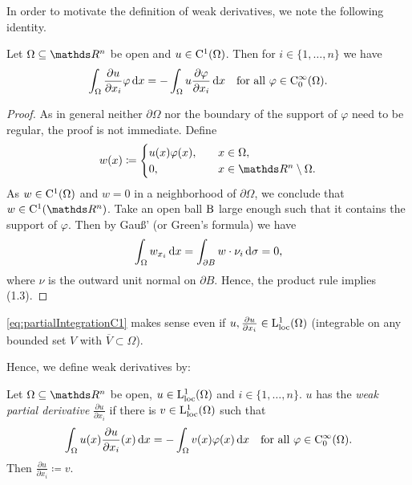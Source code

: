 In order to motivate the definition of weak derivatives, we note the following identity.

\begin{lem}
  \label{lem:partialIntegrationC1}
  Let $\Omega \subseteq \R^n$ be open and $u \in \mathrm{C}^1(\Omega)$. 
  Then for $i \in \{1,\dots,n\}$ we have
  \begin{equation}
    \label{eq:partialIntegrationC1}
    \int_\Omega \frac{\partial u}{\partial x_i} \varphi \, {\operatorname{d}\!{x}} = -\int_\Omega u \frac{\partial \varphi}{\partial x_i} \, {\operatorname{d}\!{x}} \quad \text{for all } \varphi \in \mathrm{C}_0^\infty(\Omega).
  \end{equation}
\end{lem}
\begin{proof}
  As in general neither $\partial \Omega$ nor the boundary of the support of $\varphi$ need to be regular, the proof is not immediate.
  Define
  $$
  w(x) \coloneqq  \begin{cases} u(x) \varphi(x), \quad &x \in \Omega, \\
    0, \quad &x \in \R^n \setminus \Omega .\end{cases}
  $$
  As $w \in \mathrm{C}^1(\Omega)$ and $w = 0$ in a neighborhood of $\partial \Omega$, we conclude that $w \in \CC^1(\R^n)$.
  Take an open ball $\mathrm{B}$ large enough such that it contains the support of $\varphi$. 
  Then by Gauß' (or Green's formula) we have
  $$
  \int_\Omega w_{x_i} \, {\operatorname{d}\!{x}} 
  = \int_{\partial B} w \cdot \nu_i \, {\operatorname{d}\!{\sigma}} = 0,
  $$
  where $\nu$ is the outward unit normal on $\partial B$.
  Hence, the product rule implies (1.3).
\end{proof}
\eqref{eq:partialIntegrationC1} makes sense even if $u, \frac{\partial u}{\partial x_i} \in \mathrm{L}_{\operatorname{loc}}^1(\Omega)$ (integrable on any bounded set $V$ with $\overline V \subset \Omega$).

Hence, we define weak derivatives by:

\begin{defn}
  Let $\Omega \subseteq \R^n$ be open, $u \in \mathrm{L}_{\operatorname{loc}}^1(\Omega)$ and $i \in \{1,\dots,n\}$.
  $u$ has the \emph{weak partial derivative} $\frac{\partial u}{\partial x_i}$ if there is $v \in \mathrm{L}_{\operatorname{loc}}^1(\Omega)$ such that
  \begin{equation}
    \label{eq:weakDerivativeDef}
    \int_\Omega u(x) \frac{\partial u}{\partial x_i}(x) \, {\operatorname{d}\!{x}} = -\int_\Omega v(x) \varphi(x) \, {\operatorname{d}\!{x}} \quad \text{for all } \varphi \in \mathrm{C}_0^\infty(\Omega).    
  \end{equation}
  Then $\frac{\partial u}{\partial x_i} \coloneqq v$.
\end{defn}

